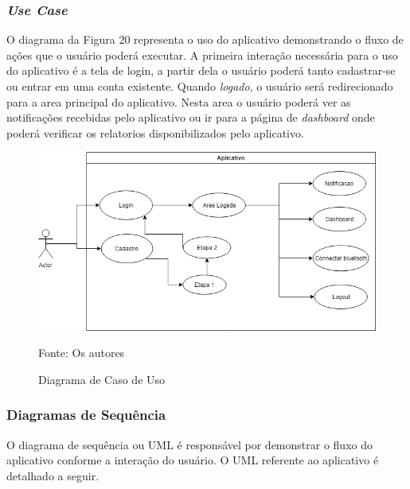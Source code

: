    





\subsubsection{\textit{Use Case}}

O diagrama da Figura 20 representa o uso do aplicativo demonstrando o fluxo de ações que o usuário poderá executar. A primeira interação necessária para o uso do aplicativo é a tela de login, a partir dela o usuário poderá tanto cadastrar-se ou entrar em uma conta existente. 
Quando \textit{logado}, o usuário será redirecionado para a area principal do aplicativo. Nesta area o usuário poderá ver as notificações recebidas pelo aplicativo ou ir para a página de \textit{dashboard} onde poderá verificar os relatorios disponibilizados pelo aplicativo.




\begin{figure}[H]

 \caption{Diagrama de Caso de Uso}
\begin{center}
  \includegraphics[width=150mm]{images/Cap3/Diagrama_de_Caso_de_Uso.png}
  \end{center}
      Fonte: Os autores
\end{figure}

 




\subsubsection{Diagramas de Sequência}

O diagrama de sequência ou UML é responsável por demonstrar o fluxo do aplicativo conforme a interação do usuário. O UML referente ao aplicativo é detalhado a seguir.

